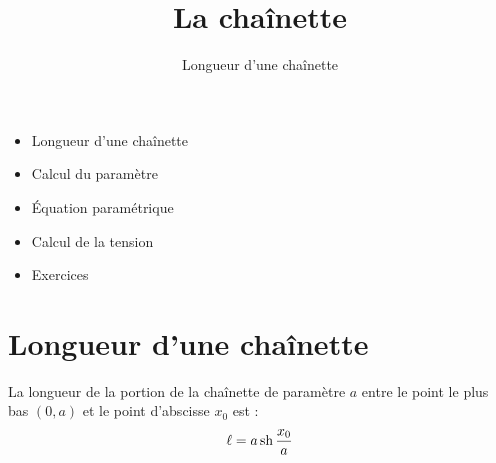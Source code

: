 

   





\title{{\bf La chaînette}}
\subtitle{Longueur d'une chaînette}

\begin{frame}
  
  \debutmontitre

  \pause

{\footnotesize
\hfill
{}
\begin{minipage}{0.6\textwidth}
  \begin{itemize}
    \item<3-> Longueur d'une chaînette
    \item<4-> Calcul du paramètre
    \item<5-> \'Equation paramétrique
    \item<6-> Calcul de la tension
    \item<7-> Exercices
  \end{itemize}
\end{minipage}
}

\end{frame}

\setcounter{framenumber}{0}


\section{Longueur d'une chaînette}

\begin{frame}
\begin{proposition}
\label{prop:long}
La longueur de la portion de la chaînette de paramètre $a$ entre le point le plus 
bas $(0,a)$ et le point d'abscisse $x_0$ est :
$$\ell = a \mathop{\text{sh}}\nolimits \frac{x_0}{a}$$
\end{proposition}
\shorthandoff{:}
\shorthandon{:}
\end{frame}


